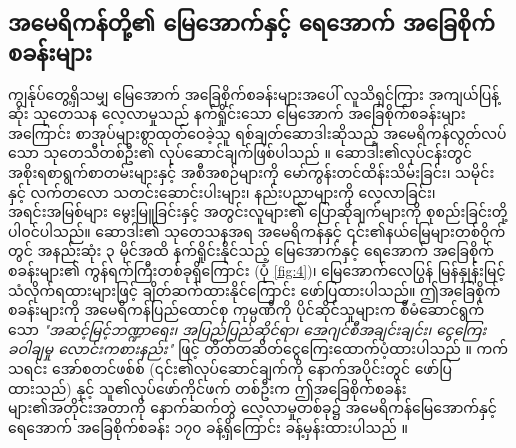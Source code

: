 \documentclass[10pt,twocolumn,letterpaper]{article}
\begin{document}
\subsection{အမေရိကန်တို့၏ မြေအောက်နှင့် ရေအောက် အခြေစိုက်စခန်းများ}

ကျွန်ုပ်တွေ့ရှိသမျှ မြေအောက် အခြေစိုက်စခန်းများအပေါ် လူသိရှင်ကြား အကျယ်ပြန့်ဆုံး သုတေသန လေ့လာမှုသည် နက်ရှိုင်းသော မြေအောက် အခြေစိုက်စခန်းများအကြောင်း စာအုပ်များစွာထုတ်ဝေခဲ့သူ ရစ်ချတ်ဆောဒါးဆိုသည့် အမေရိကန်လွတ်လပ်သော သုတေသီတစ်ဦး၏ လုပ်ဆောင်ချက်ဖြစ်ပါသည် \cite{22}။ ဆောဒါး၏လုပ်ငန်းတွင် အစိုးရစာရွက်စာတမ်းများနှင့် အစီအစဉ်များကို မော်ကွန်းတင်ထိန်းသိမ်းခြင်း၊ သမိုင်းနှင့် လက်တလော သတင်းဆောင်းပါးများ၊ နည်းပညာများကို လေ့လာခြင်း၊ အရင်းအမြစ်များ မွေးမြူခြင်းနှင့် အတွင်းလူများ၏ ပြောဆိုချက်များကို စုစည်းခြင်းတို့ ပါဝင်ပါသည်။ ဆောဒါး၏ သုတေသနအရ အမေရိကန်နှင့် ၎င်း၏နယ်မြေများတစ်ဝိုက်တွင် အနည်းဆုံး ၃ မိုင်အထိ နက်ရှိုင်းနိုင်သည့် မြေအောက်နှင့် ရေအောက် အခြေစိုက်စခန်းများ၏ ကွန်ရက်ကြီးတစ်ခုရှိကြောင်း (ပုံ \ref{fig:4})၊ မြေအောက်လေပြွန် မြန်နှုန်းမြင့် သံလိုက်ရထားများဖြင့် ချိတ်ဆက်ထားနိုင်ကြောင်း  ဖော်ပြထားပါသည်။ ဤအခြေစိုက်စခန်းများကို အမေရိကန်ပြည်ထောင်စု ကုမ္ပဏီကို ပိုင်ဆိုင်သူများက စီမံဆောင်ရွက်သော \textit{"အဆင့်မြင့်ဘဏ္ဍာရေး၊ အပြည်ပြည်ဆိုင်ရာ၊ အေဂျင်စီအချင်းချင်း၊ ငွေကြေးခဝါချမှု လောင်းကစားနည်း"} ဖြင့် တိတ်တဆိတ်ငွေကြေးထောက်ပံ့ထားပါသည် \cite{22}။ ကက်သရင်း အော်စတင်ဖစ်စ် (၎င်း၏လုပ်ဆောင်ချက်ကို နောက်အပိုင်းတွင် ဖော်ပြထားသည်) နှင့် သူ၏လုပ်ဖော်ကိုင်ဖက် တစ်ဦးက ဤအခြေစိုက်စခန်းများ၏အတိုင်းအတာကို နောက်ဆက်တွဲ လေ့လာမှုတစ်ခု၌ အမေရိကန်မြေအောက်နှင့် ရေအောက် အခြေစိုက်စခန်း ၁၇၀ ခန့်ရှိကြောင်း ခန့်မှန်းထားပါသည် \cite{16,20}။
\end{document}

